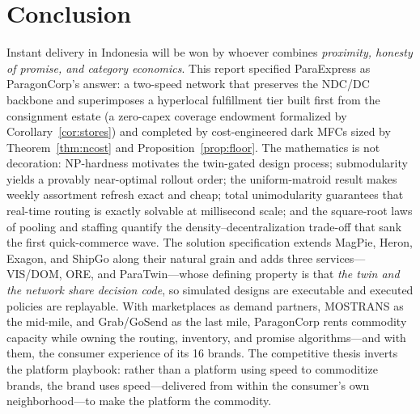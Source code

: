 \documentclass[journal]{IEEEtran}
\begin{document}
\section{Conclusion}
\label{sec:conclusion}
Instant delivery in Indonesia will be won by whoever combines \emph{proximity, honesty of promise, and category economics}. This report specified ParaExpress as ParagonCorp's answer: a two-speed network that preserves the NDC/DC backbone and superimposes a hyperlocal fulfillment tier built first from the consignment estate (a zero-capex coverage endowment formalized by Corollary~\ref{cor:stores}) and completed by cost-engineered dark MFCs sized by Theorem~\ref{thm:ncost} and Proposition~\ref{prop:floor}. The mathematics is not decoration: NP-hardness motivates the twin-gated design process; submodularity yields a provably near-optimal rollout order; the uniform-matroid result makes weekly assortment refresh exact and cheap; total unimodularity guarantees that real-time routing is exactly solvable at millisecond scale; and the square-root laws of pooling and staffing quantify the density--decentralization trade-off that sank the first quick-commerce wave. The solution specification extends MagPie, Heron, Exagon, and ShipGo along their natural grain and adds three services---VIS/DOM, ORE, and ParaTwin---whose defining property is that \emph{the twin and the network share decision code}, so simulated designs are executable and executed policies are replayable. With marketplaces as demand partners, MOSTRANS as the mid-mile, and Grab/GoSend as the last mile, ParagonCorp rents commodity capacity while owning the routing, inventory, and promise algorithms---and with them, the consumer experience of its 16 brands. The competitive thesis inverts the platform playbook: rather than a platform using speed to commoditize brands, the brand uses speed---delivered from within the consumer's own neighborhood---to make the platform the commodity.
\end{document}
